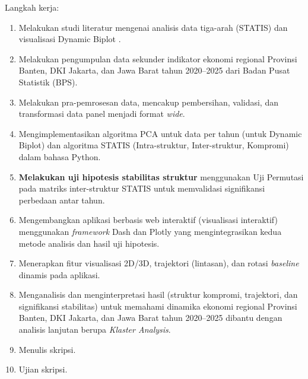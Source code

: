 \documentclass[a4paper]{article}
\theoremstyle{definition} %
\begin{document}
Langkah kerja:
\begin{enumerate}
	\item Melakukan studi literatur mengenai analisis data tiga-arah (STATIS) \citep{lavit94, oliveira2024} dan visualisasi Dynamic Biplot \citep{egido2015}.
	\item Melakukan pengumpulan data sekunder indikator ekonomi regional Provinsi Banten, DKI Jakarta, dan Jawa Barat tahun 2020--2025 dari Badan Pusat Statistik (BPS).
	\item Melakukan pra-pemrosesan data, mencakup pembersihan, validasi, dan transformasi data panel menjadi format \textit{wide}.
	\item Mengimplementasikan algoritma PCA untuk data per tahun (untuk Dynamic Biplot) dan algoritma STATIS (Intra-struktur, Inter-struktur, Kompromi) dalam bahasa Python.
    \item \textbf{Melakukan uji hipotesis stabilitas struktur} menggunakan Uji Permutasi pada matriks inter-struktur STATIS \citep{kazi1995} untuk memvalidasi signifikansi perbedaan antar tahun.
	\item Mengembangkan aplikasi berbasis web interaktif (visualisasi interaktif) menggunakan \textit{framework} Dash dan Plotly yang mengintegrasikan kedua metode analisis dan hasil uji hipotesis.
	\item Menerapkan fitur visualisasi 2D/3D, trajektori (lintasan), dan rotasi \textit{baseline} dinamis pada aplikasi.
	\item Menganalisis dan menginterpretasi hasil (struktur kompromi, trajektori, dan signifikansi stabilitas) untuk memahami dinamika ekonomi regional Provinsi Banten, DKI Jakarta, dan Jawa Barat tahun 2020--2025 dibantu dengan analisis lanjutan berupa \textit{Klaster Analysis}.
	\item Menulis skripsi.
	\item Ujian skripsi.
\end{enumerate}
\end{document}
